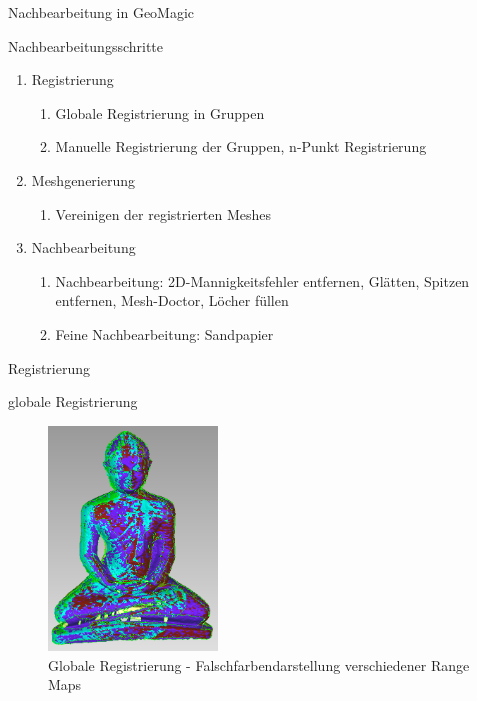 \begin{frame}{Nachbearbeitung in GeoMagic}

\begin{block}{Nachbearbeitungsschritte}
\begin{enumerate}
\item Registrierung
\begin{enumerate}
\item Globale Registrierung in Gruppen
\item Manuelle Registrierung der Gruppen, n-Punkt Registrierung
\end{enumerate}
\item Meshgenerierung
\begin{enumerate}
\item Vereinigen der registrierten Meshes
\end{enumerate}
\item Nachbearbeitung
\begin{enumerate}
\item Nachbearbeitung: 2D-Mannigkeitsfehler entfernen, Glätten, Spitzen entfernen, Mesh-Doctor, Löcher füllen
\item Feine Nachbearbeitung: Sandpapier
\end{enumerate}
\end{enumerate}
\end{block}

\end{frame}

\begin{frame}{Registrierung}

\begin{block}{globale Registrierung}
\begin{figure}[H]
\centering
\includegraphics[width=0.4\textwidth]{images/GeoMagicBudhaPictures/Budha_Scans_Aufrecht_globalRegistration_2.PNG}
\caption{Globale Registrierung - Falschfarbendarstellung verschiedener Range Maps}
\label{fig:budhaGlobal}
\end{figure}
\end{block}

\end{frame}

